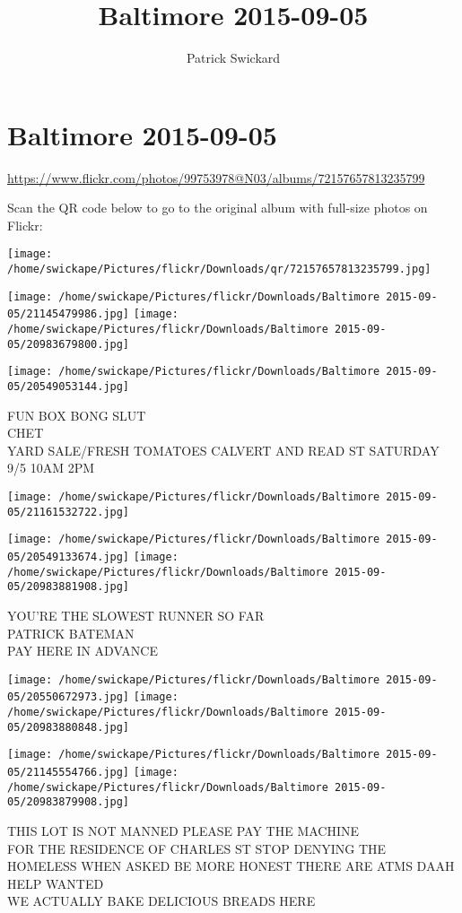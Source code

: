 \documentclass[10pt,letterpaper]{article}
\title{Baltimore 2015-09-05}
\author{Patrick Swickard}
\date{}
\begin{document}
\section*{Baltimore 2015-09-05}

\url{https://www.flickr.com/photos/99753978@N03/albums/72157657813235799}

Scan the QR code below to go to the original album with full-size photos on Flickr:

\texttt{[image: /home/swickape/Pictures/flickr/Downloads/qr/72157657813235799.jpg]}
\pagebreak

\texttt{[image: /home/swickape/Pictures/flickr/Downloads/Baltimore 2015-09-05/21145479986.jpg]}
\texttt{[image: /home/swickape/Pictures/flickr/Downloads/Baltimore 2015-09-05/20983679800.jpg]}

\texttt{[image: /home/swickape/Pictures/flickr/Downloads/Baltimore 2015-09-05/20549053144.jpg]}

FUN BOX BONG SLUT\\
CHET\\
YARD SALE/FRESH TOMATOES CALVERT AND READ ST SATURDAY 9/5 10AM 2PM
\pagebreak

\texttt{[image: /home/swickape/Pictures/flickr/Downloads/Baltimore 2015-09-05/21161532722.jpg]}

\vspace{0.25in}
\texttt{[image: /home/swickape/Pictures/flickr/Downloads/Baltimore 2015-09-05/20549133674.jpg]}
\texttt{[image: /home/swickape/Pictures/flickr/Downloads/Baltimore 2015-09-05/20983881908.jpg]}

YOU'RE THE SLOWEST RUNNER SO FAR\\
PATRICK BATEMAN\\
PAY HERE IN ADVANCE
\pagebreak

\texttt{[image: /home/swickape/Pictures/flickr/Downloads/Baltimore 2015-09-05/20550672973.jpg]}
\texttt{[image: /home/swickape/Pictures/flickr/Downloads/Baltimore 2015-09-05/20983880848.jpg]}

\texttt{[image: /home/swickape/Pictures/flickr/Downloads/Baltimore 2015-09-05/21145554766.jpg]}
\texttt{[image: /home/swickape/Pictures/flickr/Downloads/Baltimore 2015-09-05/20983879908.jpg]}

THIS LOT IS NOT MANNED PLEASE PAY THE MACHINE\\
FOR THE RESIDENCE OF CHARLES ST STOP DENYING THE HOMELESS WHEN ASKED BE MORE HONEST THERE ARE ATMS DAAH\\
HELP WANTED\\
WE ACTUALLY BAKE DELICIOUS BREADS HERE
\pagebreak
\end{document}
